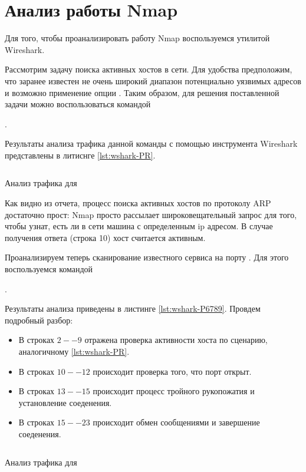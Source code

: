 \section{Анализ работы Nmap}

Для того, чтобы проанализировать работу Nmap воспользуемся утилитой Wireshark. 

Рассмотрим задачу поиска активных хостов в сети. Для удобства предположим, что заранее известен не очень широкий диапазон потенциально
уязвимых адресов и возможно применение опции . Таким образом, для решения поставленной задачи можно воспользоваться командой
\begin{center}
    .
\end{center}
Результаты анализа трафика данной команды с помощью инструмента Wireshark представлены в литиснге \ref{lst:wshark-PR}.

\begin{listing}[H]
    \inputminted[linenos=true]{console}{resources/12_wshark_PR}
    \caption{Анализ трафика для }
    \label{lst:wshark-PR}
\end{listing}

Как видно из отчета, процесс поиска активных хостов по протоколу ARP достаточно прост: Nmap просто рассылает широковещательный запрос
для того, чтобы узнат, есть ли в сети машина с определенным ip адресом. В случае получения ответа (строка 10) хост считается активным.

Проанализируем теперь сканирование известного сервиса на порту . Для этого воспользуемся командой 
\begin{center}
    .
\end{center}
Результаты анализа приведены в листинге \ref{lst:wshark-P6789}. Провдем подробный разбор:
\begin{itemize}
    \item В строках $2 -- 9$ отражена проверка активности хоста по сценарию, аналогичному \ref{lst:wshark-PR}.  
    \item В строках $10 -- 12$ происходит проверка того, что порт открыт.
    \item В строках $13 -- 15$ происходит процесс тройного рукопожатия и установление соеденения.
    \item В строках $15 -- 23$ происходит обмен сообщениями и завершение соеденения.
\end{itemize}

\begin{listing}[H]
    \inputminted[linenos=true]{console}{resources/13_wshark_P6789}
    \caption{Анализ трафика для }
    \label{lst:wshark-P6789}
\end{listing}